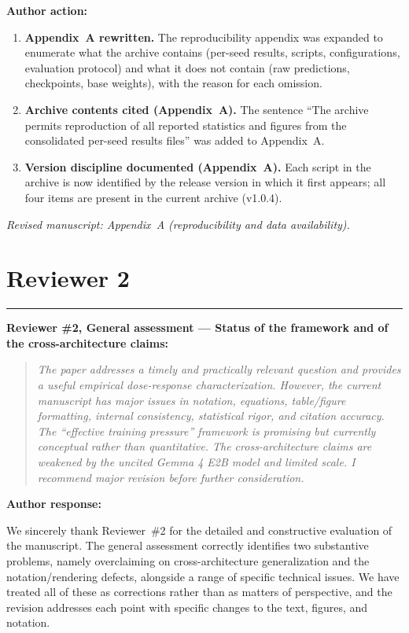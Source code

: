 \documentclass[11pt,a4paper]{article}
\newcommand{\rconcern}[3]{%
  \bigskip\noindent\rule{\linewidth}{0.4pt}\par\medskip
  \noindent\textbf{\textcolor{rccolor}{#1 --- #2:}}\par
  \smallskip
  \begin{quote}\itshape\textcolor{rccolor}{#3}\end{quote}%
}
\newcommand{\arhead}[1]{\medskip\noindent\textbf{#1}\par\smallskip}
\newcommand{\newtext}[1]{\textcolor{chgcolor}{``#1''}}
\newcommand{\msloc}[1]{%
  \smallskip\noindent\textit{Revised manuscript: #1}\par%
}
\begin{document}
\arhead{Author action:}
\begin{enumerate}[leftmargin=1.4em,itemsep=0.3em]
\item \textbf{Appendix~A rewritten.}
      The reproducibility appendix was expanded to enumerate what the
      archive contains (per-seed results, scripts, configurations,
      evaluation protocol) and what it does not contain (raw predictions,
      checkpoints, base weights), with the reason for each omission.
\item \textbf{Archive contents cited (Appendix~A).}
      The sentence \newtext{The archive permits reproduction of all
      reported statistics and figures from the consolidated per-seed
      results files} was added to Appendix~A.
\item \textbf{Version discipline documented (Appendix~A).}
      Each script in the archive is now identified by the release
      version in which it first appears; all four items are present in
      the current archive (v1.0.4).
\end{enumerate}

\msloc{Appendix~A (reproducibility and data availability).}



\section*{Reviewer 2}

\rconcern{Reviewer \#2, General assessment}{Status of the framework and
of the cross-architecture claims}{%
The paper addresses a timely and practically relevant question and
provides a useful empirical dose-response characterization. However, the
current manuscript has major issues in notation, equations,
table/figure formatting, internal consistency, statistical rigor, and
citation accuracy. The ``effective training pressure'' framework is
promising but currently conceptual rather than quantitative. The
cross-architecture claims are weakened by the uncited Gemma 4 E2B model
and limited scale. I recommend major revision before further
consideration.}

\arhead{Author response:}
We sincerely thank Reviewer~\#2 for the detailed and constructive evaluation of the manuscript. The general assessment correctly identifies two substantive problems, namely overclaiming on cross-architecture generalization and the notation/rendering defects, alongside a range of specific technical issues. We have treated all of these as corrections rather than as matters of perspective, and the revision addresses each point with specific changes to the text, figures, and notation.
\end{document}
